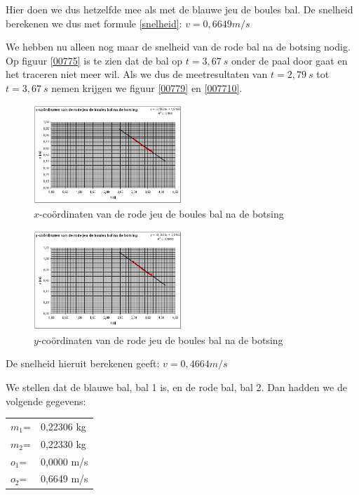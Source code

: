 \documentclass[12pt,a4paper]{article}
\begin{document}
	Hier doen we dus hetzelfde mee als met de blauwe jeu de boules bal. De snelheid berekenen we dus met formule \eqref{snelheid}: $v=0,6649m/s$
	
	We hebben nu alleen nog maar de snelheid van de rode bal na de botsing nodig. Op figuur \eqref{00775} is te zien dat de bal op $t=3,67\ s$ onder de paal door gaat en het traceren niet meer wil. Als we dus de meetresultaten van $t=2,79\ s$ tot $t=3,67\ s$ nemen krijgen we figuur \eqref{00779} en \eqref{007710}.
	
	\begin{figure}[h]
		\centerline{\includegraphics[width=0.5\textwidth]{Plaatjes/00779.png}}
		\caption{$x$-co\"{o}rdinaten van de rode jeu de boules bal na de botsing}
		\label{00779}
	\end{figure}
	
	\begin{figure}[h]
		\centerline{\includegraphics[width=0.5\textwidth]{Plaatjes/007710.png}}
		\caption{$y$-co\"{o}rdinaten van de rode jeu de boules bal na de botsing}
		\label{007710}
	\end{figure}

	De snelheid hieruit berekenen geeft: $v=0,4664m/s$

	We stellen dat de blauwe bal, bal 1 is, en de rode bal, bal 2.
	Dan hadden we de volgende gegevens:

	\begin{tabular}{  l l }
		$m_1$= &0,22306 kg\\
		$m_2$= &0,22330 kg\\
		$o_1$= &0,0000 m/s\\
		$o_2$= &0,6649 m/s\\
	\end{tabular}
\end{document}
